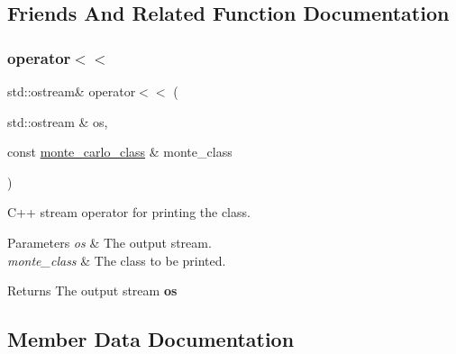 \subsection{Friends And Related Function Documentation}
\mbox{\label{structMonteCarlo_1_1monte__carlo__class_a24eb0421cd0a0c30fa7b97ca39b4bf09}} 
\subsubsection{\texorpdfstring{operator$<$$<$}{operator<<}}
{\footnotesize\ttfamily std\+::ostream\& operator$<$$<$ (\begin{DoxyParamCaption}\item[{std\+::ostream \&}]{os,  }\item[{const \hyperlink{structMonteCarlo_1_1monte__carlo__class}{monte\+\_\+carlo\+\_\+class} \&}]{monte\+\_\+class }\end{DoxyParamCaption})\hspace{0.3cm}{\ttfamily [friend]}}

C++ stream operator for printing the class. 
\begin{DoxyParams}{Parameters}
{\em os} & The output stream. \\
\hline
{\em monte\+\_\+class} & The class to be printed. \\
\hline
\end{DoxyParams}
\begin{DoxyReturn}{Returns}
The output stream {\bfseries os} 
\end{DoxyReturn}


\subsection{Member Data Documentation}
\mbox{\label{structMonteCarlo_1_1monte__carlo__class_aa18ef8c3608fb1816dad7ea914f85634}} 
